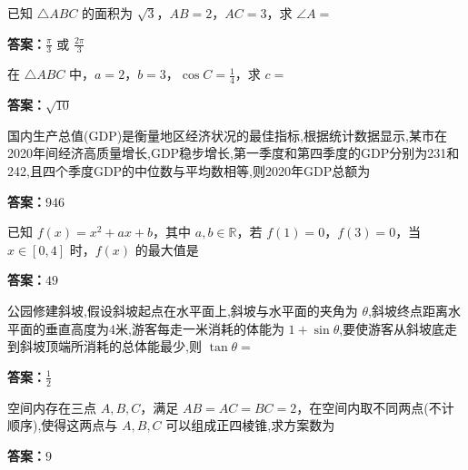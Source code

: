 \begin{question}[points=5]
已知 $\triangle ABC$ 的面积为 $\sqrt{3}$，$AB=2$，$AC=3$，求 $\angle A=$
\begin{solution}
\textbf{答案：}$\frac{\pi}{3}$ 或 $\frac{2\pi}{3}$
\end{solution}
\end{question}

\begin{question}[points=5]
在 $\triangle ABC$ 中，$a=2$，$b=3$，$\cos C = \frac{1}{4}$，求 $c=$
\fillin[{$\sqrt{10}$}]
\begin{solution}
\textbf{答案：}$\sqrt{10}$
\end{solution}
\end{question}

\begin{question}[points=5]
国内生产总值(GDP)是衡量地区经济状况的最佳指标,根据统计数据显示,某市在2020年间经济高质量增长,GDP稳步增长,第一季度和第四季度的GDP分别为231和242,且四个季度GDP的中位数与平均数相等,则2020年GDP总额为
\fillin[{$946$}]
\begin{solution}
\textbf{答案：}$946$
\end{solution}
\end{question}

\begin{question}[points=5]
已知 $f(x)=x^2+ax+b$，其中 $a,b\in \mathbb{R}$，若 $f(1)=0$，$f(3)=0$，当 $x\in[0,4]$ 时，$f(x)$ 的最大值是
\fillin[{$49$}]
\begin{solution}
\textbf{答案：}$49$
\end{solution}
\end{question}

\begin{question}[points=5]
公园修建斜坡,假设斜坡起点在水平面上,斜坡与水平面的夹角为 $\theta$,斜坡终点距离水平面的垂直高度为4米,游客每走一米消耗的体能为 $1+\sin \theta$,要使游客从斜坡底走到斜坡顶端所消耗的总体能最少,则 $\tan \theta=$
\fillin[{$\frac{1}{2}$}]
\begin{solution}
\textbf{答案：}$\frac{1}{2}$
\end{solution}
\end{question}

\begin{question}[points=5]
空间内存在三点 $A,B,C$，满足 $AB=AC=BC=2$，在空间内取不同两点(不计顺序),使得这两点与 $A,B,C$ 可以组成正四棱锥,求方案数为
\fillin[{$9$}]
\begin{solution}
\textbf{答案：}$9$
\end{solution}
\end{question}

